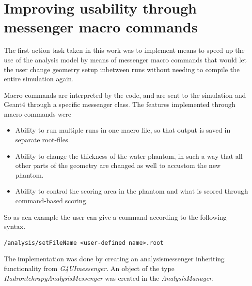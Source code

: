 \renewcommand{\theequation}{D\arabic{equation}}
\setcounter{equation}{0}  
\renewcommand{\thefigure}{D\arabic{figure}}
\setcounter{figure}{0}
\renewcommand{\thetable}{D\arabic{table}}
\setcounter{table}{0}
\renewcommand{\thesection}{D}
\setcounter{section}{1}
\section*{Improving usability through messenger macro commands \label{logofwork}}

The first action task taken in this work was to implement means to speed up the use of the analysis model by means of messenger macro commands that would let the user change geometry setup inbetween runs without needing to compile the entire simulation again.

Macro commands are interpreted by the code, and are sent to the simulation and Geant4 through a specific messenger class. The features implemented through macro commands were
\begin{itemize}
 \item Ability to run multiple runs in one macro file, so that output is saved in separate root-files.
\item Ability to change the thickness of the water phantom, in such a way that all other parts of the geometry are changed as well to accustom the new phantom.
\item Ability to control the scoring area in the phantom and what is scored through command-based scoring.
\end{itemize}


So as aen example the user can give a command according to the following syntax.
\scriptsize
\begin{verbatim}
/analysis/setFileName <user-defined name>.root
\end{verbatim}
\normalsize

The implementation was done by creating an analysismessenger inheriting functionality from \textit{G4UImessenger}. An object of the type \textit{HadrontehrapyAnalysisMessenger} was created in the \textit{AnalysisManager}.


